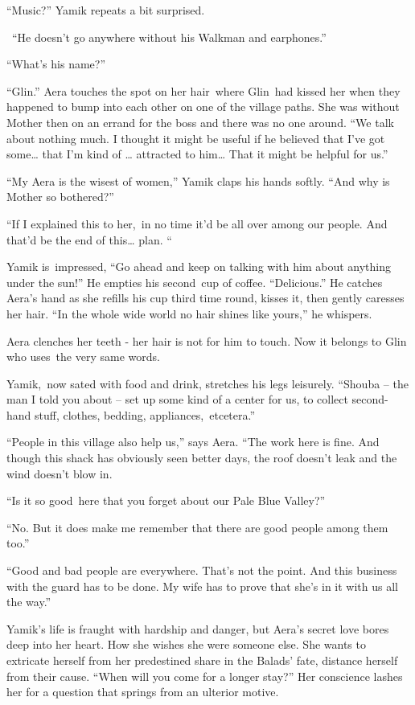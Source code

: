 \documentclass[letterpaper]{article}
\begin{document}
{}``Music?'' Yamik repeats a bit surprised.

~``He doesn't go anywhere without his Walkman and earphones.'' 

{}``What's his name?'' 

{}``Glin.'' Aera touches the spot on her hair~where Glin\ had kissed her when they happened to bump into each other on
one of the village paths. She was without Mother then on an errand for the boss and there was no one around. ``We talk
about nothing much. I thought it might be useful if he believed that I've got some{\dots}  that I'm kind of {\dots}
attracted to him{\dots} That it might be helpful for us.'' 

{}``My Aera is the wisest of women,'' Yamik claps his hands softly. ``And why is Mother so bothered?'' 

{}``If I explained this to her,\ in no time it'd be all over among our people. And that'd be the end of this{\dots}
plan. ``

Yamik is~impressed, ``Go ahead and keep on talking with him about anything under the sun!'' He empties his second~cup of
coffee. ``Delicious.'' He catches Aera's hand as she refills his cup third time round, kisses it, then gently caresses
her hair. {}``In the whole wide world no hair shines like yours,{}'' he whispers.

Aera clenches her teeth - her hair is not for him to touch. Now it belongs to Glin who uses\ the very same words.~ 

Yamik,\ now sated with food and drink, stretches his legs leisurely. ``Shouba -- the man I told you about -- set up some
kind of a center for us, to collect second-hand stuff, clothes, bedding, appliances,\ etcetera.'' 

{}``People in this village also help us,'' says Aera. ``The work here is fine. And though this shack has obviously seen
better days, the roof doesn't leak and the wind doesn't blow in.{\textquotedbl}

{}``Is it so good~here that you forget about our Pale Blue Valley?'' 

{}``No. But it does make me remember that there are good people among them too.'' 

{}``Good and bad people are everywhere. That's not the point. And this business with the guard has to be done. My wife
has to prove that she's in it with us all the way.''

Yamik's life is fraught with hardship and danger, but Aera's secret love bores deep into her heart. How she wishes she
were someone else. She wants to extricate herself from her predestined share in the Balads' fate, distance herself from
their cause. ``When will you come for a longer stay?'' Her conscience lashes her for a question that springs from an
ulterior motive. 
\end{document}
